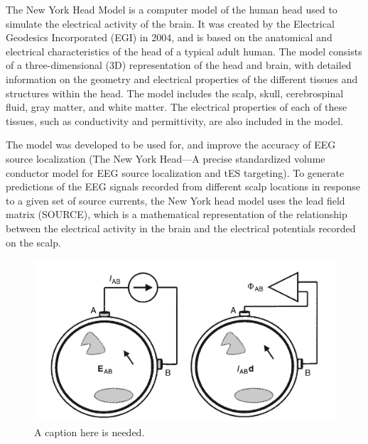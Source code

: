 \documentclass[a4paper, UKenglish, 11pt]{uiomaster}
\begin{document}
The New York Head Model is a computer model of the human head used to simulate the electrical activity of the brain. It was created by the Electrical Geodesics Incorporated (EGI) in 2004, and is based on the anatomical and electrical characteristics of the head of a typical adult human. The model consists of a three-dimensional (3D) representation of the head and brain, with detailed information on the geometry and electrical properties of the different tissues and structures within the head. The model includes the scalp, skull, cerebrospinal fluid, gray matter, and white matter. The electrical properties of each of these tissues, such as conductivity and permittivity, are also included in the model.

The model was developed to be used for, and improve the accuracy of EEG source localization (The New York Head—A precise standardized volume conductor model for EEG source localization and tES targeting). To generate predictions of the EEG signals recorded from different scalp locations in response to a given set of source currents, the New York head model uses the lead field matrix (SOURCE), which is a mathematical representation of the relationship between the electrical activity in the brain and the electrical potentials recorded on the scalp.

\begin{figure}
  \includegraphics[width=\linewidth]{figures/lead_fields.png}
  \caption{A caption here is needed.}
  \label{fig:lead_field}
\end{figure}
\end{document}
